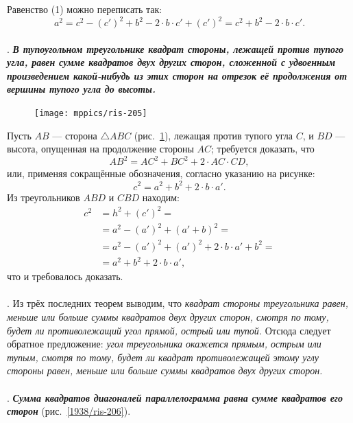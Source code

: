\documentclass[twoside]{book}
\begin{document}
Равенство (1) можно переписать так:
\[a^2=c^2-(c')^2+b^2-2\cdot b\cdot c'+(c')^2=c^2+b^2-2\cdot b\cdot c'.\]

\paragraph{}\label{1938/195}
\mbox{.}
\textbf{\emph{В тупоугольном треугольнике квадрат стороны, лежащей против тупого угла, равен сумме квадратов двух других сторон, сложенной с удвоенным произведением какой-нибудь из этих сторон на отрезок её продолжения от вершины тупого угла до высоты.}}


\begin{figure}
\vskip-5mm
\centering
\texttt{[image: mppics/ris-205]}
\caption{}\label{1938/ris-205}
\end{figure}


Пусть $AB$ — сторона $\triangle ABC$ (рис.~\ref{1938/ris-205}), лежащая против тупого угла $C$, и $BD$ — высота, опущенная на продолжение стороны $AC$;
требуется доказать, что
\[AB^2=AC^2+BC^2+2\cdot AC \cdot  CD,\]
или, применяя сокращённые обозначения, согласно указанию на рисунке:
\[c^2=a^2+b^2+2\cdot b\cdot a'.\]
Из треугольников $ABD$ и $CBD$ находим:
\begin{align*}
c^2&=h^2+(c')^2=
\\
&=a^2-(a')^2+(a'+b)^2=
\\
&=a^2-(a')^2+(a')^2+2\cdot b\cdot a'+b^2=
\\
&=a^2+b^2+2\cdot b\cdot a',
\end{align*}
что и требовалось доказать.

\paragraph{}\label{1938/196}
.
Из трёх последних теорем выводим, что \emph{квадрат стороны треугольника равен, меньше или больше суммы квадратов двух других сторон, смотря по тому, будет ли противолежащий угол прямой, острый или тупой.}
Отсюда следует обратное предложение:
\emph{угол треугольника окажется прямым, острым или тупым, смотря по тому, будет ли квадрат противолежащей этому углу стороны равен, меньше или больше суммы квадратов двух других сторон.}

\paragraph{}\label{1938/197}
.
\textbf{\emph{Сумма квадратов диагоналей параллелограмма равна сумме квадратов его сторон}} (рис.~\ref{1938/ris-206}).
\end{document}
